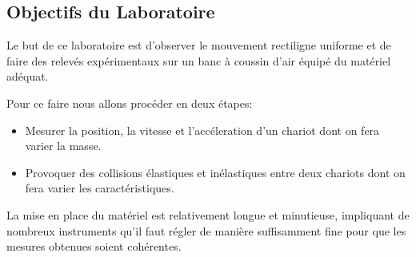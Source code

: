\subsection*{Objectifs du Laboratoire}

Le but de ce laboratoire est d'observer le mouvement rectiligne uniforme et de faire des relevés expérimentaux sur un banc à coussin d'air équipé du matériel adéquat.

Pour ce faire nous allons procéder en deux étapes:

\begin{itemize}
    \item Mesurer la position, la vitesse et l'accéleration d'un chariot dont on fera varier la masse.
    \item Provoquer des collisions élastiques et inélastiques entre deux chariots dont on fera varier les caractéristiques.
\end{itemize}

La mise en place du matériel est relativement longue et minutieuse, impliquant de nombreux instruments qu'il faut régler de manière suffisamment fine pour que les mesures obtenues soient cohérentes.
